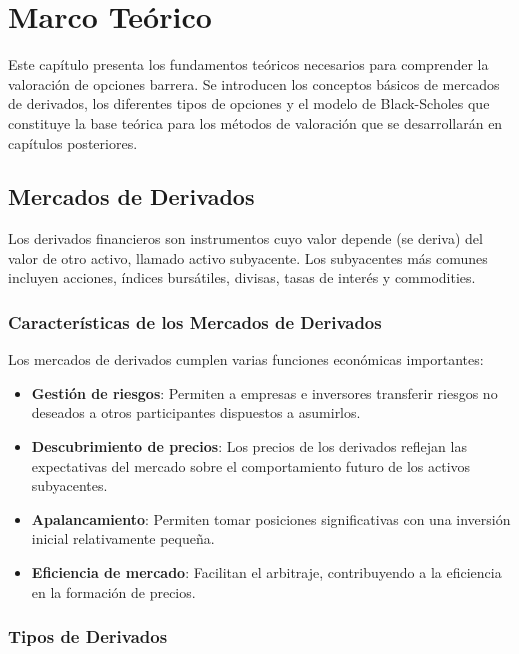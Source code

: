\chapter{Marco Teórico}
\label{chapter:marco_teorico}

Este capítulo presenta los fundamentos teóricos necesarios para comprender la valoración de opciones barrera. Se introducen los conceptos básicos de mercados de derivados, los diferentes tipos de opciones y el modelo de Black-Scholes que constituye la base teórica para los métodos de valoración que se desarrollarán en capítulos posteriores.

\section{Mercados de Derivados}

Los derivados financieros son instrumentos cuyo valor depende (se deriva) del valor de otro activo, llamado activo subyacente. Los subyacentes más comunes incluyen acciones, índices bursátiles, divisas, tasas de interés y commodities.

\subsection{Características de los Mercados de Derivados}

Los mercados de derivados cumplen varias funciones económicas importantes:

\begin{itemize}
    \item \textbf{Gestión de riesgos}: Permiten a empresas e inversores transferir riesgos no deseados a otros participantes dispuestos a asumirlos.
    
    \item \textbf{Descubrimiento de precios}: Los precios de los derivados reflejan las expectativas del mercado sobre el comportamiento futuro de los activos subyacentes.
    
    \item \textbf{Apalancamiento}: Permiten tomar posiciones significativas con una inversión inicial relativamente pequeña.
    
    \item \textbf{Eficiencia de mercado}: Facilitan el arbitraje, contribuyendo a la eficiencia en la formación de precios.
\end{itemize}

\subsection{Tipos de Derivados}

